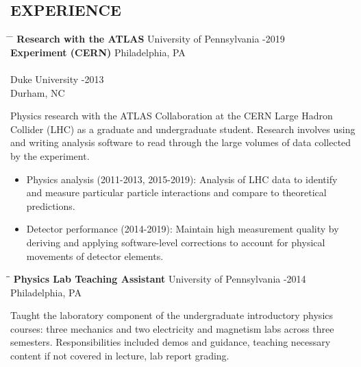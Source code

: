 \documentclass{res}
\begin{document}
\begin{resume}
\section{EXPERIENCE}\vspace{-5pt}
   \begin{tabbing}
   \hspace{2.3in}\= \hspace{2.55in} \= \kill %
    {\bf Research with the ATLAS} \>University of Pennsylvania -2019\\
    {\bf Experiment (CERN)} \> Philadelphia, PA \\
    \\
    \> Duke University -2013 \\
    \> Durham, NC
   \end{tabbing}\vspace{-18pt}
   Physics research with the ATLAS Collaboration at the CERN Large Hadron Collider (LHC) as a graduate and undergraduate student.
   Research involves using and writing analysis software to read through the large volumes of data collected by the experiment.
   \begin{itemize}
     \item Physics analysis (2011-2013, 2015-2019): Analysis of LHC data to identify and measure particular particle interactions and compare to theoretical predictions.
     \item Detector performance (2014-2019): Maintain high measurement quality by deriving and applying software-level corrections to account for physical movements of detector elements.
   \end{itemize}
   

   \vspace{-0.1in}	
   \begin{tabbing}
   \hspace{2.3in}\= \hspace{2.6in}\= \kill %
    {\bf Physics Lab Teaching Assistant} \>University of Pennsylvania     -2014\\
                             \>Philadelphia, PA
   \end{tabbing}\vspace{-18pt}      %
   Taught the laboratory component of the undergraduate introductory physics courses: three mechanics and two electricity and magnetism labs across three semesters.
   Responsibilities included demos and guidance, teaching necessary content if not covered in lecture, lab report grading.


\end{resume}
\end{document}
